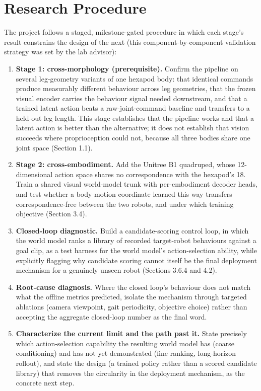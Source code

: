 \documentclass[12pt,a4paper,oneside]{report}
\begin{document}
\section{Research Procedure}
The project follows a staged, milestone-gated procedure in which each stage's result constrains the design of the
next (this component-by-component validation strategy was set by the lab advisor):
\begin{enumerate}[label=\arabic*.]
\item \textbf{Stage 1: cross-morphology (prerequisite).} Confirm the pipeline on several leg-geometry variants of one
  hexapod body: that identical commands produce measurably different behaviour across leg geometries, that the frozen
  visual encoder carries the behaviour signal needed downstream, and that a trained latent action beats a
  raw-joint-command baseline and transfers to a held-out leg length. This stage establishes that the pipeline
  works and that a latent action is better than the alternative; it does not establish that vision succeeds where
  proprioception could not, because all three bodies share one joint space (Section 1.1).
\item \textbf{Stage 2: cross-embodiment.} Add the Unitree B1 quadruped, whose 12-dimensional action space shares
  no correspondence with the hexapod's 18. Train a shared visual world-model trunk with per-embodiment decoder
  heads, and test whether a body-motion coordinate learned this way transfers correspondence-free between the two
  robots, and under which training objective (Section 3.4).
\item \textbf{Closed-loop diagnostic.} Build a candidate-scoring control loop, in which the world model ranks a
  library of recorded target-robot behaviours against a goal clip, as a test harness for the world model's
  action-selection ability, while explicitly flagging why candidate scoring cannot itself be the final deployment
  mechanism for a genuinely unseen robot (Sections 3.6.4 and 4.2).
\item \textbf{Root-cause diagnosis.} Where the closed loop's behaviour does not match what the offline metrics
  predicted, isolate the mechanism through targeted ablations (camera viewpoint, gait periodicity, objective
  choice) rather than accepting the aggregate closed-loop number as the final word.
\item \textbf{Characterize the current limit and the path past it.} State precisely which action-selection
  capability the resulting world model has (coarse conditioning) and has not yet demonstrated (fine ranking,
  long-horizon rollout), and state the design (a trained policy rather than a scored candidate library) that
  removes the circularity in the deployment mechanism, as the concrete next step.
\end{enumerate}
\end{document}
